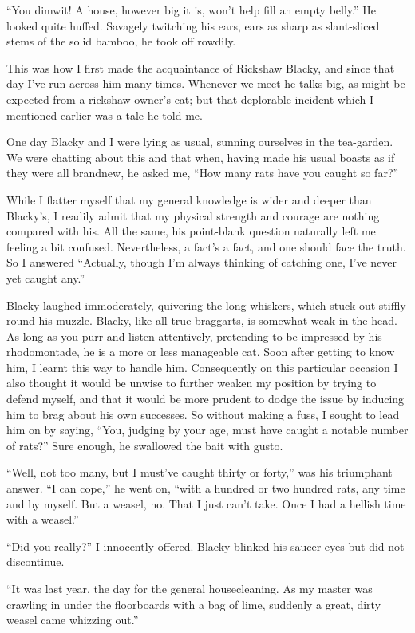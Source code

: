 \documentclass{book}
\begin{document}
``You dimwit! A house, however big it is, won't help fill an empty
belly.'' He looked quite huffed. Savagely twitching his ears, ears as
sharp as slant-sliced stems of the solid bamboo, he took off rowdily.

This was how I first made the acquaintance of Rickshaw Blacky, and since
that day I've run across him many times. Whenever we meet he talks big,
as might be expected from a rickshaw-owner's cat; but that deplorable
incident which I mentioned earlier was a tale he told me.

One day Blacky and I were lying as usual, sunning ourselves in the
tea-garden. We were chatting about this and that when, having made his
usual boasts as if they were all brandnew, he asked me, ``How many rats
have you caught so far?''

While I flatter myself that my general knowledge is wider and deeper
than Blacky's, I readily admit that my physical strength and courage are
nothing compared with his. All the same, his point-blank question
naturally left me feeling a bit confused. Nevertheless, a fact's a fact,
and one should face the truth. So I answered ``Actually, though I'm
always thinking of catching one, I've never yet caught any.''

Blacky laughed immoderately, quivering the long whiskers, which stuck
out stiffly round his muzzle. Blacky, like all true braggarts, is
somewhat weak in the head. As long as you purr and listen attentively,
pretending to be impressed by his rhodomontade, he is a more or less
manageable cat. Soon after getting to know him, I learnt this way to
handle him. Consequently on this particular occasion I also thought it
would be unwise to further weaken my position by trying to defend
myself, and that it would be more prudent to dodge the issue by inducing
him to brag about his own successes. So without making a fuss, I sought
to lead him on by saying, ``You, judging by your age, must have caught a
notable number of rats?'' Sure enough, he swallowed the bait with gusto.

``Well, not too many, but I must've caught thirty or forty,'' was his
triumphant answer. ``I can cope,'' he went on, ``with a hundred or two
hundred rats, any time and by myself. But a weasel, no. That I just
can't take. Once I had a hellish time with a weasel.''

``Did you really?'' I innocently offered. Blacky blinked his saucer eyes
but did not discontinue.

``It was last year, the day for the general housecleaning. As my master
was crawling in under the floorboards with a bag of lime, suddenly a
great, dirty weasel came whizzing out.''
\end{document}
